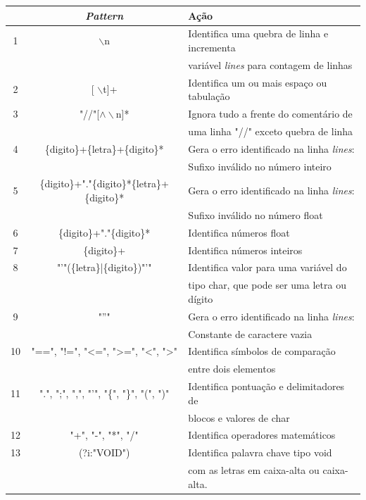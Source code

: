 \documentclass[12pt]{article}
\begin{document}
\begin{table}
 \centering
 \begin{tabular}{|c || c  l |} 
 \hline
   & \textit{Pattern} & Ação \\ [0.5ex] 
 \hline \hline
 1 & $\backslash$n	& Identifica uma quebra de linha e incrementa \\&& variável \textit{lines} para contagem de linhas \\ 
 \hline
 2 & [ $\backslash$t]+ 	& Identifica um ou mais espaço ou tabulação\\
 \hline
 3 & "//"[$\wedge\backslash$n]* & Ignora tudo a frente do comentário de \\&& uma linha "//" exceto quebra de linha \\
 \hline
 4 & \{digito\}+\{letra\}+\{digito\}* & {\color{red}Gera o erro identificado na linha \textit{lines}:} \\&& {\color{red}Sufixo inválido no número inteiro} \\
 \hline
 5 & {\footnotesize \{digito\}+"."\{digito\}*\{letra\}+\{digito\}*} & {\color{red}Gera o erro identificado na linha \textit{lines}:} \\&& {\color{red}Sufixo inválido no número float} \\
 \hline
 6 & \{digito\}+"."\{digito\}* & Identifica números float\\
 \hline
 7 & \{digito\}+ & Identifica números inteiros\\
 \hline
 8 & "'"(\{letra\}|\{digito\})"'" & Identifica valor para uma variável do \\&& tipo char, que pode ser uma letra ou dígito\\
 \hline
 9 & "''" & {\color{red}Gera o erro identificado na linha \textit{lines}:} \\&& {\color{red}Constante de caractere vazia} \\
 \hline 
 10 & "==", "!=", "<=", ">=", "<", ">" & Identifica símbolos de comparação \\&& entre dois elementos \\
 \hline
 11 & ".", ";", ",", "'", "\{", "\}", "(", ")" & Identifica pontuação e delimitadores de \\&& blocos e valores de char\\
 \hline
 12 & "+", "-", "*", "/" & Identifica operadores matemáticos \\
 \hline
 13 & (?i:"VOID")& Identifica palavra chave tipo void \\&& com as letras em caixa-alta ou caixa-alta. \\

\end{tabular}
\end{table}
\end{document}
